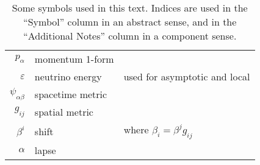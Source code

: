 \begin{table}
\begin{tabular}{rll}
    $p_\alpha$            & momentum 1-form           & \\
    $\varepsilon$         & neutrino energy           & used for asymptotic and local \\
    $\psi_{\alpha\beta}$  & spacetime metric          & \\
    $g_{ij}$              & spatial metric            & \\
    $\beta^i$             & shift                     & where $\beta_i = \beta^j g_{ij}$ \\
    $\alpha$              & lapse                     & \\
  \end{tabular}
  \caption[Symbols used in the text]{
    Some symbols used in this text.
    Indices are used in the ``Symbol'' column in an abstract sense, and in the
    ``Additional Notes'' column in a component sense.
  }
  \label{tab:conventions}
\end{table}
